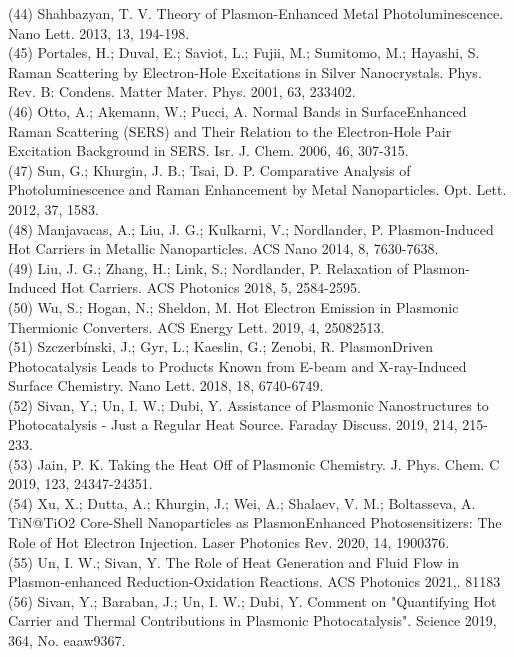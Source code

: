 \documentclass[10pt]{article}
\begin{document}
(44) Shahbazyan, T. V. Theory of Plasmon-Enhanced Metal Photoluminescence. Nano Lett. 2013, 13, 194-198.\\
(45) Portales, H.; Duval, E.; Saviot, L.; Fujii, M.; Sumitomo, M.; Hayashi, S. Raman Scattering by Electron-Hole Excitations in Silver Nanocrystals. Phys. Rev. B: Condens. Matter Mater. Phys. 2001, 63, 233402.\\
(46) Otto, A.; Akemann, W.; Pucci, A. Normal Bands in SurfaceEnhanced Raman Scattering (SERS) and Their Relation to the Electron-Hole Pair Excitation Background in SERS. Isr. J. Chem. 2006, 46, 307-315.\\
(47) Sun, G.; Khurgin, J. B.; Tsai, D. P. Comparative Analysis of Photoluminescence and Raman Enhancement by Metal Nanoparticles. Opt. Lett. 2012, 37, 1583.\\
(48) Manjavacas, A.; Liu, J. G.; Kulkarni, V.; Nordlander, P. Plasmon-Induced Hot Carriers in Metallic Nanoparticles. ACS Nano 2014, 8, 7630-7638.\\
(49) Liu, J. G.; Zhang, H.; Link, S.; Nordlander, P. Relaxation of Plasmon-Induced Hot Carriers. ACS Photonics 2018, 5, 2584-2595.\\
(50) Wu, S.; Hogan, N.; Sheldon, M. Hot Electron Emission in Plasmonic Thermionic Converters. ACS Energy Lett. 2019, 4, 25082513.\\
(51) Szczerbínski, J.; Gyr, L.; Kaeslin, G.; Zenobi, R. PlasmonDriven Photocatalysis Leads to Products Known from E-beam and X-ray-Induced Surface Chemistry. Nano Lett. 2018, 18, 6740-6749.\\
(52) Sivan, Y.; Un, I. W.; Dubi, Y. Assistance of Plasmonic Nanostructures to Photocatalysis - Just a Regular Heat Source. Faraday Discuss. 2019, 214, 215-233.\\
(53) Jain, P. K. Taking the Heat Off of Plasmonic Chemistry. J. Phys. Chem. C 2019, 123, 24347-24351.\\
(54) Xu, X.; Dutta, A.; Khurgin, J.; Wei, A.; Shalaev, V. M.; Boltasseva, A. TiN@TiO2 Core-Shell Nanoparticles as PlasmonEnhanced Photosensitizers: The Role of Hot Electron Injection. Laser Photonics Rev. 2020, 14, 1900376.\\
(55) Un, I. W.; Sivan, Y. The Role of Heat Generation and Fluid Flow in Plasmon-enhanced Reduction-Oxidation Reactions. ACS Photonics 2021,. 81183\\
(56) Sivan, Y.; Baraban, J.; Un, I. W.; Dubi, Y. Comment on "Quantifying Hot Carrier and Thermal Contributions in Plasmonic Photocatalysis". Science 2019, 364, No. eaaw9367.\\
\end{document}
